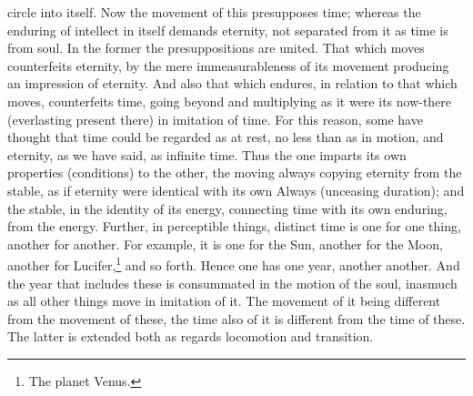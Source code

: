 \documentclass{article}
\begin{document}
circle into itself. Now the movement of this presupposes time; whereas the enduring of intellect in itself demands eternity, not separated from it as time is from soul. In the former the presuppositions are united. That which moves counterfeits eternity, by the mere immeasurableness of its movement producing an impression of eternity. And also that which endures, in relation to that which moves, counterfeits time, going beyond and multiplying as it were its now-there (everlasting present there) in imitation of time. For this reason, some have thought that time could be regarded as at rest, no less than as in motion, and eternity, as we have said, as infinite time. Thus the one imparts its own properties (conditions) to the other, the moving always copying eternity from the stable, as if eternity were identical with its own Always (unceasing duration); and the stable, in the identity of its energy, connecting time with its own enduring, from the energy. Further, in perceptible things, distinct time is one for one thing, another for another. For example, it is one for the Sun, another for the Moon, another for Lucifer,\footnote{The planet Venus.} and so forth. Hence one has one year, another another. And the year that includes these is consummated in the motion of the soul, inasmuch as all other things move in imitation of it. The movement of it being different from the movement of these, the time also of it is different from the time of these. The latter is extended both as regards locomotion and transition.
\end{document}
